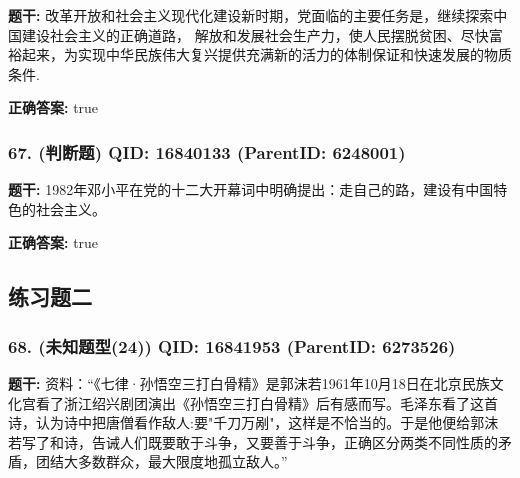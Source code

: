 \documentclass[12pt,UTF8]{ctexart}
\begin{document}
\textbf{题干:}
改革开放和社会主义现代化建设新时期，党面临的主要任务是，继续探索中国建设社会主义的正确道路， 解放和发展社会生产力，使人民摆脱贫困、尽快富裕起来，为实现中华民族伟大复兴提供充满新的活力的体制保证和快速发展的物质条件.



\textbf{正确答案:}
true

\vspace{0.3em}\hrulefill\vspace{0.7em}

\subsubsection*{67. (判断题) \small QID: 16840133 (ParentID: 6248001)}

\textbf{题干:}
1982年邓小平在党的十二大开幕词中明确提出：走自己的路，建设有中国特色的社会主义。



\textbf{正确答案:}
true

\vspace{0.3em}\hrulefill\vspace{0.7em}

\subsection*{练习题二}

\subsubsection*{68. (未知题型(24)) \small QID: 16841953 (ParentID: 6273526)}

\textbf{题干:}
资料：“《七律·孙悟空三打白骨精》是郭沫若1961年10月18日在北京民族文化宫看了浙江绍兴剧团演出《孙悟空三打白骨精》后有感而写。毛泽东看了这首诗，认为诗中把唐僧看作敌人:要"千刀万剐"，这样是不恰当的。于是他便给郭沫若写了和诗，告诫人们既要敢于斗争，又要善于斗争，正确区分两类不同性质的矛盾，团结大多数群众，最大限度地孤立敌人。”
\end{document}
